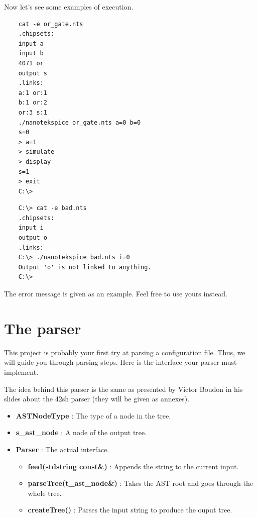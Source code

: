 \documentclass{koala-en}
\begin{document}
  Now let's see some examples of execution.

  \begin{lstlisting}
    cat -e or_gate.nts
    .chipsets:
    input a
    input b
    4071 or
    output s
    .links:
    a:1 or:1
    b:1 or:2
    or:3 s:1
    ./nanotekspice or_gate.nts a=0 b=0
    s=0
    > a=1
    > simulate
    > display
    s=1
    > exit
    C:\>
  \end{lstlisting}

  \begin{lstlisting}
    C:\> cat -e bad.nts
    .chipsets:
    input i
    output o
    .links:
    C:\> ./nanotekspice bad.nts i=0
    Output 'o' is not linked to anything.
    C:\>
  \end{lstlisting}

  \hint
  {
      The error message is given as an example. Feel free to use yours instead.
  }

  \section{The parser}

    This project is probably your first try at parsing a configuration file. Thus, we will guide you through
  parsing steps.
  Here is the interface your parser must implement.

  

    The idea behind this parser is the same as presented by Victor Boudon in his slides about the 42sh parser
  (they will be given as annexes).

  \begin{itemize}
  \item \textbf{ASTNodeType} : The type of a node in the tree.
  \item \textbf{s\_ast\_node} : A node of the output tree.
  \item \textbf{Parser} : The actual interface.
    \begin{itemize}
    \item \textbf{feed(std\:\:string const\&)} : Appends the string to the current input.
    \item \textbf{parseTree(t\_ast\_node\&)} : Takes the AST root and goes through the whole tree.
    \item \textbf{createTree()} : Parses the input string to produce the ouput tree.
    \end{itemize}
  \end{itemize}
\end{document}
